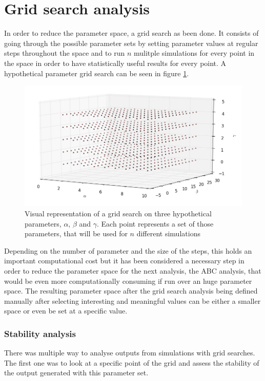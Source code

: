 \documentclass[a4paper,12pt]{report}
\begin{document}
\section{Grid search analysis}

In order to reduce the parameter space, a grid search as been done. It consists of going through the possible parameter sets by setting parameter values at regular steps throughout the space and to run $n$ mulitple simulations for every point in the space in order to have statistically useful results for every point. A hypothetical parameter grid search can be seen in figure \ref{grid}.

\begin{figure}
	\centering
	\includegraphics[scale=0.7]{../data/grid.png}
	\caption{Visual representation of a grid search on three hypothetical parameters, $\alpha$, $\beta$ and $\gamma$. Each point represents a set of those parameters, that will be used for $n$ different simulations}
	\label{grid}
\end{figure}

Depending on the number of parameter and the size of the steps, this holds an important computational cost but it has been considered a necessary step in order to reduce the parameter space for the next analysis, the ABC analysis, that would be even more computationally consuming if run over an huge parameter space. The resulting parameter space after the grid search analysis being defined manually after selecting interesting and meaningful values can be either a smaller space or even be set at a specific value.

\subsubsection{Stability analysis}
There was multiple way to analyse outputs from simulations with grid searches. The first one was to look at a specific point of the grid and assess the stability of the output generated with this parameter set.
\end{document}
